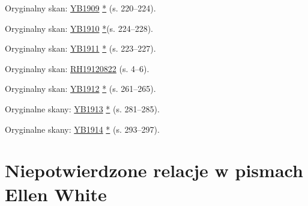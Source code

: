 
Oryginalny skan: \href{https://documents.adventistarchives.org/Yearbooks/YB1909.pdf#search=Yearbook%201909}{YB1909} \href{https://forgotten-pillar.s3.us-east-2.amazonaws.com/YB1909.pdf}{*} (s. 220--224).


Oryginalny skan: \href{https://documents.adventistarchives.org/Yearbooks/YB1910.pdf#search=Yearbook%201910}{YB1910} \href{https://forgotten-pillar.s3.us-east-2.amazonaws.com/YB1910.pdf}{*}(s. 224--228).


Oryginalny skan: \href{https://documents.adventistarchives.org/Yearbooks/YB1911.pdf#search=Yearbook%201910}{YB1911} \href{https://forgotten-pillar.s3.us-east-2.amazonaws.com/YB1911.pdf}{*} (s. 223--227).


Oryginalny skan: \href{https://adventistdigitallibrary.org/adl-351682/advent-review-and-sabbath-herald-august-22-1912?view_only=true&solr_nav%5Bid%5D=ff4d7f3f77b9bdf9e9ac&solr_nav%5Bpage%5D=0&solr_nav%5Boffset%5D=15}{RH19120822} (s. 4--6).


Oryginalny skan: \href{https://documents.adventistarchives.org/Yearbooks/YB1912.pdf#search=Yearbook%201910}{YB1912} \href{https://forgotten-pillar.s3.us-east-2.amazonaws.com/YB1912.pdf}{*} (s. 261--265).


Oryginalne skany: \href{https://documents.adventistarchives.org/Yearbooks/YB1913.pdf#search=Yearbook%201913}{YB1913} \href{https://forgotten-pillar.s3.us-east-2.amazonaws.com/YB1913.pdf}{*} (s. 281--285).


Oryginalne skany: \href{https://documents.adventistarchives.org/Yearbooks/YB1914.pdf#search=Yearbook%201914}{YB1914} \href{https://forgotten-pillar.s3.us-east-2.amazonaws.com/YB1914.pdf}{*} (s. 293--297).

\section*{Niepotwierdzone relacje w pismach Ellen White}

